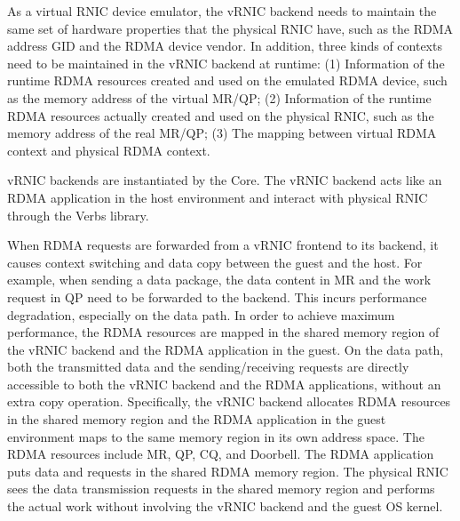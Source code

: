 As a virtual RNIC device emulator, the vRNIC backend needs to maintain the same set of hardware properties that the physical RNIC have, such as the RDMA address GID and the RDMA device vendor. In addition, three kinds of contexts need to be maintained in the vRNIC backend at runtime:
(1) Information of the runtime RDMA resources created and used on the emulated RDMA device, such as the memory address of the virtual MR/QP;
(2) Information of the runtime RDMA resources actually created and used on the physical RNIC, such as the memory address of the real MR/QP;
(3) The mapping between virtual RDMA context and physical RDMA context.

vRNIC backends are instantiated by the \sys Core.
The vRNIC backend acts like an RDMA application in the host environment and interact with physical RNIC through the Verbs library.


When RDMA requests are forwarded from a vRNIC frontend to its backend, it causes context switching and data copy between the guest and the host. For example, when sending a data package, the data content in MR and the work request in QP need to be forwarded to the backend. This incurs performance degradation, especially on the data path. In order to achieve maximum performance, the RDMA resources are mapped in the shared memory region of the vRNIC backend and the RDMA application in the guest. On the data path, both the transmitted data and the sending/receiving requests are directly accessible to both the vRNIC backend and the RDMA applications, without an extra copy operation. Specifically, the vRNIC backend allocates RDMA resources in the shared memory region and the RDMA application in the guest environment maps to the same memory region in its own address space. The RDMA resources include MR, QP, CQ, and Doorbell. The RDMA application puts data and requests in the shared RDMA memory region. The physical RNIC sees the data transmission requests in the shared memory region and performs the actual work without involving the vRNIC backend and the guest OS kernel.

